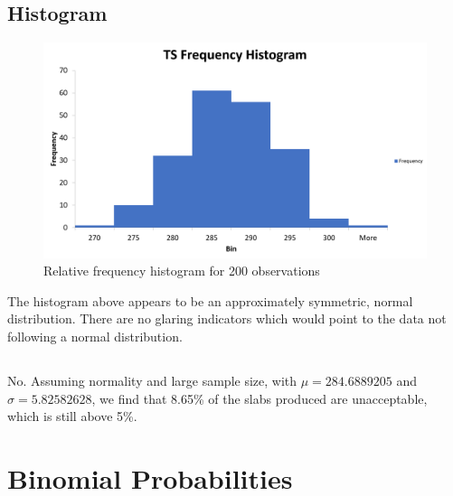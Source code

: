 \documentclass[letterpaper]{article}
\begin{document}
\subsection{Histogram}
\begin{figure}[H]
 \centering
 \includegraphics[width=\textwidth]{histogram.png}
 \caption{Relative frequency histogram for 200 observations}
 \label{histogram}
\end{figure}

The histogram above appears to be an approximately symmetric, normal distribution.
There are no glaring indicators which would point to the data not following
a normal distribution.

\subsection{} %
No. Assuming normality and large sample size, with $\mu = 284.6889205$ and
$\sigma = 5.82582628$, we find that 8.65\% of the slabs produced are
unacceptable, which is still above 5\%.

\subsection{} %

\section{Binomial Probabilities}

\subsection{} %

\subsection{} %
\end{document}
